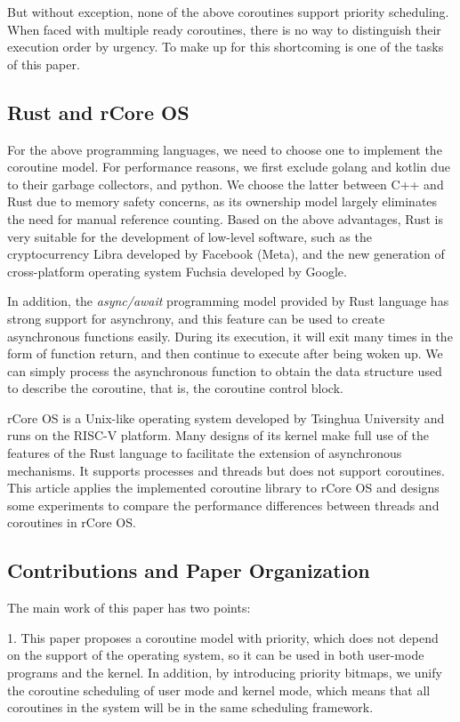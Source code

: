 \documentclass[10pt]{article}
\begin{document}
But without exception, none of the above coroutines support priority scheduling. When faced with multiple ready coroutines, there is no way to distinguish their execution order by urgency. To make up for this shortcoming is one of the tasks of this paper.

\subsection{Rust and rCore OS}

For the above programming languages, we need to choose one to implement the coroutine model. For performance reasons, we first exclude golang and kotlin due to their garbage collectors, and python. We choose the latter between C++ and Rust due to memory safety concerns, as its ownership model largely eliminates the need for manual reference counting. Based on the above advantages, Rust is very suitable for the development of low-level software, such as the cryptocurrency Libra developed by Facebook (Meta), and the new generation of cross-platform operating system Fuchsia developed by Google.

In addition, the \textit{async/await} programming model provided by Rust language has strong support for asynchrony, and this feature can be used to create asynchronous functions easily. During its execution, it will exit many times in the form of function return, and then continue to execute after being woken up. We can simply process the asynchronous function to obtain the data structure used to describe the coroutine, that is, the coroutine control block.

rCore OS is a Unix-like operating system developed by Tsinghua University and runs on the RISC-V platform. Many designs of its kernel make full use of the features of the Rust language to facilitate the extension of asynchronous mechanisms. It supports processes and threads but does not support coroutines. This article applies the implemented coroutine library to rCore OS and designs some experiments to compare the performance differences between threads and coroutines in rCore OS.

\subsection{Contributions and Paper Organization}

The main work of this paper has two points:

1. This paper proposes a coroutine model with priority, which does not depend on the support of the operating system, so it can be used in both user-mode programs and the kernel. In addition, by introducing priority bitmaps, we unify the coroutine scheduling of user mode and kernel mode, which means that all coroutines in the system will be in the same scheduling framework.
\end{document}
